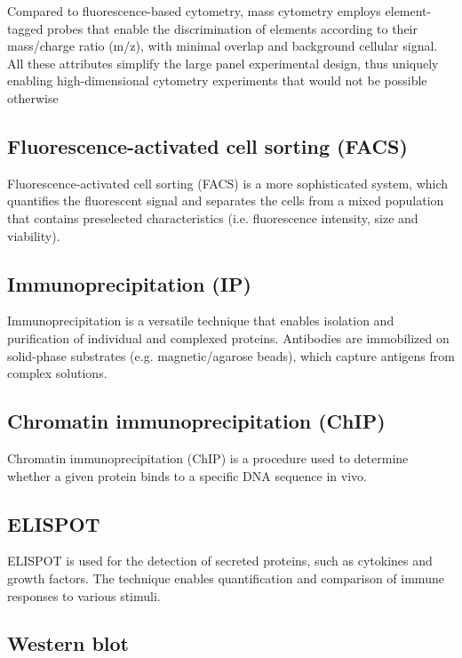 Compared to fluorescence-based cytometry, mass cytometry employs element-tagged
probes that enable the discrimination of elements according to their mass/charge
ratio (m/z), with minimal overlap and background cellular signal. All these
attributes simplify the large panel experimental design, thus uniquely enabling
high-dimensional cytometry experiments that would not be possible otherwise



\subsection{Fluorescence-activated cell sorting (FACS)}
\label{sec:FACS}

Fluorescence-activated cell sorting (FACS) is a more sophisticated system,
which quantifies the fluorescent signal and separates the cells from a mixed
population that contains preselected characteristics (i.e. fluorescence
intensity, size and viability).  

\subsection{Immunoprecipitation (IP)}
\label{sec:Immunoprecipitation}

Immunoprecipitation is a versatile technique that enables isolation and
purification of individual and complexed proteins.
Antibodies are immobilized on solid-phase substrates (e.g. magnetic/agarose
beads), which capture antigens from complex solutions.

\subsection{Chromatin immunoprecipitation (ChIP)}
\label{sec:ChIP}

Chromatin immunoprecipitation (ChIP) is a procedure used to determine whether a
given protein binds to a specific DNA sequence in vivo.


\subsection{ELISPOT}
\label{sec:ELISPOT}

ELISPOT is used for the detection of secreted proteins, such as cytokines and
growth factors. The technique enables quantification and comparison of immune
responses to various stimuli. 



\subsection{Western blot}
\label{sec:Western-blot}

